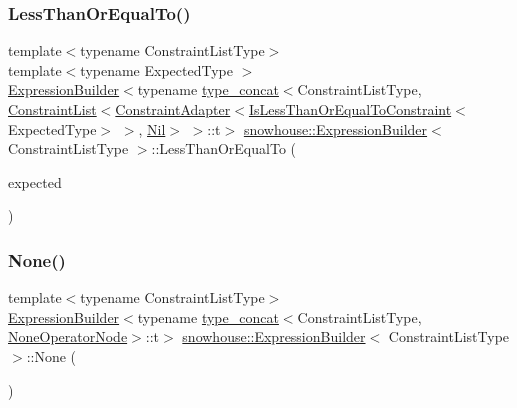 \subsubsection{\texorpdfstring{LessThanOrEqualTo()}{LessThanOrEqualTo()}}
{\footnotesize\ttfamily template$<$typename Constraint\+List\+Type$>$ \\
template$<$typename Expected\+Type $>$ \\
\mbox{\hyperlink{structsnowhouse_1_1ExpressionBuilder}{Expression\+Builder}}$<$typename \mbox{\hyperlink{structsnowhouse_1_1type__concat}{type\+\_\+concat}}$<$Constraint\+List\+Type, \mbox{\hyperlink{structsnowhouse_1_1ConstraintList}{Constraint\+List}}$<$\mbox{\hyperlink{structsnowhouse_1_1ConstraintAdapter}{Constraint\+Adapter}}$<$\mbox{\hyperlink{structsnowhouse_1_1IsLessThanOrEqualToConstraint}{Is\+Less\+Than\+Or\+Equal\+To\+Constraint}}$<$Expected\+Type$>$ $>$, \mbox{\hyperlink{structsnowhouse_1_1Nil}{Nil}}$>$ $>$\+::t$>$ \mbox{\hyperlink{structsnowhouse_1_1ExpressionBuilder}{snowhouse\+::\+Expression\+Builder}}$<$ Constraint\+List\+Type $>$\+::Less\+Than\+Or\+Equal\+To (\begin{DoxyParamCaption}\item[{const Expected\+Type \&}]{expected }\end{DoxyParamCaption})\hspace{0.3cm}{\ttfamily [inline]}}

\mbox{\label{structsnowhouse_1_1ExpressionBuilder_a867aad9a4a72ee990eb9c4e0342ea7d8}} 
\subsubsection{\texorpdfstring{None()}{None()}}
{\footnotesize\ttfamily template$<$typename Constraint\+List\+Type$>$ \\
\mbox{\hyperlink{structsnowhouse_1_1ExpressionBuilder}{Expression\+Builder}}$<$typename \mbox{\hyperlink{structsnowhouse_1_1type__concat}{type\+\_\+concat}}$<$Constraint\+List\+Type, \mbox{\hyperlink{structsnowhouse_1_1ExpressionBuilder_aaf5a1da1881c71098209387a4cf2821a}{None\+Operator\+Node}}$>$\+::t$>$ \mbox{\hyperlink{structsnowhouse_1_1ExpressionBuilder}{snowhouse\+::\+Expression\+Builder}}$<$ Constraint\+List\+Type $>$\+::None (\begin{DoxyParamCaption}{ }\end{DoxyParamCaption})\hspace{0.3cm}{\ttfamily [inline]}}

